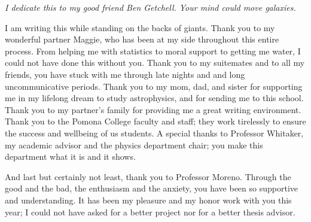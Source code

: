 
\emph{I dedicate this to my good friend Ben Getchell. Your mind could move galaxies.}

I am writing this while standing on the backs of giants. Thank you to my wonderful partner Maggie, who has been at my side throughout this entire process. From helping me with statistics to moral support to getting me water, I could not have done this without you. Thank you to my suitemates and to all my friends, you have stuck with me through late nights and and long uncommunicative periods. Thank you to my mom, dad, and sister for supporting me in my lifelong dream to study astrophysics, and for sending me to this school. Thank you to my partner's family for providing me a great writing environment. Thank you to the Pomona College faculty and staff; they work tirelessly to ensure the success and wellbeing of us students. A special thanks to Professor Whitaker, my academic advisor and the physics department chair; you make this department what it is and it shows.

And last but certainly not least, thank you to Professor Moreno. Through the good and the bad, the enthusiasm and the anxiety, you have been so supportive and understanding. It has been my pleasure and my honor work with you this year; I could not have asked for a better project nor for a better thesis advisor.